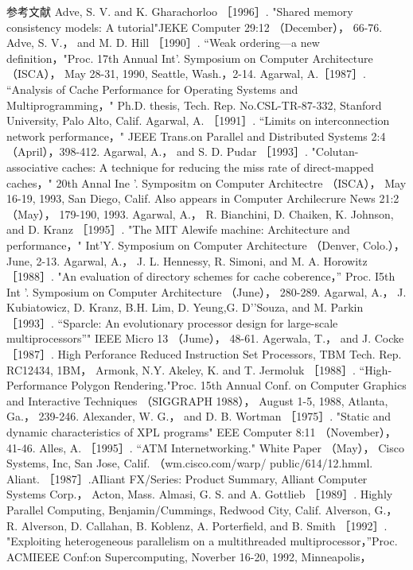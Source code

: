 
参考文献
Adve, S. V. and K. Gharachorloo ［1996］. "Shared memory consistency models: A tutorial"JEKE Computer 29:12 （December），
66-76.
Adve, S. V.， and M. D. Hill ［1990］. “Weak ordering—a new definition，"Proc. 17th Annual Int'. Symposium on Computer
Architecture （ISCA）， May 28-31, 1990, Seattle, Wash.，2-14.
Agarwal, A.［1987］. “Analysis of Cache Performance for Operating Systems and Multiprogramming，" Ph.D. thesis, Tech. Rep.
No.CSL-TR-87-332, Stanford University, Palo Alto, Calif.
Agarwal, A. ［1991］. “Limits on interconnection network performance，" JEEE Trans.on Parallel and Distributed Systems 2:4
（April），398-412.
Agarwal, A.， and S. D. Pudar ［1993］. "Colutan-associative caches: A technique for reducing the miss rate of direct-mapped
caches，" 20th Annal Ine '. Sympositm on Computer Architectre （ISCA）， May 16-19, 1993, San Diego, Calif. Also appears
in Computer Archilecrure News 21:2 （May）， 179-190, 1993.
Agarwal, A.， R. Bianchini, D. Chaiken, K. Johnson, and D. Kranz ［1995］. "The MIT Alewife machine: Architecture and
performance，" Int'Y. Symposium on Computer Architecture （Denver, Colo.）， June, 2-13.
Agarwal, A.， J. L. Hennessy, R. Simoni, and M. A. Horowitz ［1988］. "An evaluation of directory schemes for cache coberence，”
Proc. I5th Int '. Symposium on Computer Architecture （June）， 280-289.
Agarwal, A.， J. Kubiatowicz, D. Kranz, B.H. Lim, D. Yeung,G. D’'Souza, and M. Parkin ［1993］. “Sparcle: An evolutionary
processor design for large-scale multiprocessors”" IEEE Micro 13 （Jume）， 48-61.
Agerwala, T.， and J. Cocke ［1987］. High Perforance Reduced Instruction Set Processors, TBM Tech. Rep. RC12434, 1BM，
Armonk, N.Y.
Akeley, K. and T. Jermoluk ［1988］. “High-Performance Polygon Rendering."Proc. 15th Annual Conf. on Computer Graphics
and Interactive Techniques （SIGGRAPH 1988）， August 1-5, 1988, Atlanta, Ga.， 239-246.
Alexander, W. G.， and D. B. Wortman ［1975］. "Static and dynamic characteristics of XPL programs" EEE Computer 8:11
（November），41-46.
Alles, A. ［1995］. “ATM Internetworking." White Paper （May）， Cisco Systems, Inc, San Jose, Calif. （wm.cisco.com/warp/
public/614/12.hmml.
Aliant. ［1987］.AIliant FX/Series: Product Summary, Alliant Computer Systems Corp.， Acton, Mass.
Almasi, G. S. and A. Gottlieb ［1989］. Highly Parallel Computing, Benjamin/Cummings, Redwood City, Calif.
Alverson, G.， R. Alverson, D. Callahan, B. Koblenz, A. Porterfield, and B. Smith ［1992］. "Exploiting heterogeneous parallelism
on a multithreaded multiprocessor，”Proc. ACMIEEE Conf:on Supercomputing, Noverber 16-20, 1992, Minneapolis，
